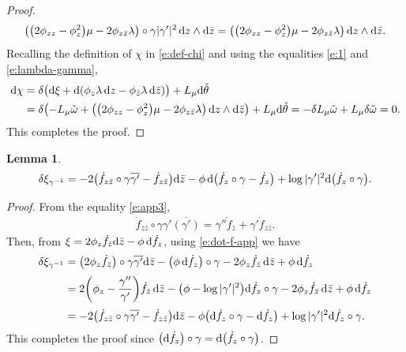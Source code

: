 \documentclass[10pt,a4paper]{amsart}
\numberwithin{equation}{section}
\newtheorem{Lemma}[Theorem]{Lemma}
\begin{document}
\begin{proof}
\begin{gather}\label{e:lambda-gamma}
\big(\big(2\phi_{zz}-\phi^2_z\big)\mu -2\phi_{z\bar{z}} \lambda \big)\circ \gamma |\gamma'|^2\, {\rm d}z\wedge {\rm d}\bar{z} = \big(\big(2\phi_{zz}-\phi^2_z\big)\mu -2\phi_{z\bar{z}} \lambda \big)\, {\rm d}z\wedge {\rm d}\bar{z}.
\end{gather}
Recalling the definition of ${\chi}$ in \eqref{e:def-chi} and using the equalities \eqref{e:1} and \eqref{e:lambda-gamma},
\begin{align*}
{\rm d}\chi &= \delta\big({\rm d}\xi+ {\rm d} (\phi_z \lambda \,{\rm d}z- \phi_{\bar{z}} \lambda\, {\rm d}\bar{z})\big) + L_{\mu}{\rm d}\check{\theta}
\\
&= \delta\big({-}L_\mu \check{\omega}+ \big(\big(2\phi_{zz}-\phi^2_z\big)\mu -2\phi_{z\bar{z}} \lambda \big)\, {\rm d}z\wedge {\rm d}\bar{z}\big)+ L_{\mu}{\rm d}\check{\theta}
= - \delta L_\mu \check{\omega} +L_\mu \delta \check{\omega} =0.
\end{align*}
This completes the proof.
\end{proof}

\begin{Lemma}\label{l:l3}
\begin{gather*}
\delta\xi_{\gamma^{-1}}=-2\big(\dot{f}_{z\bar{z}}\circ\gamma\overline{\gamma'}-\dot{f}_{z\bar{z}}\big){\rm d}\bar{z}-\phi\, {\rm d}\big(\dot{f}_z\circ\gamma-\dot{f}_z\big)+\log|\gamma'|^2 {\rm d}\big(\dot{f}_z\circ\gamma\big).
\end{gather*}
\end{Lemma}

\begin{proof}
From the equality \eqref{e:app3},
\begin{gather}\label{e:dot-f-app}
\dot{f}_{z\bar{z}} \circ \gamma \gamma' \overline{(\gamma')} = \gamma''\dot{f}_{\bar{z}} +\gamma' \dot{f}_{z\bar{z}}.
\end{gather}
Then, from $\xi= 2\phi_z \dot{f}_{\bar{z}} {\rm d}\bar{z} -\phi \,{\rm d}\dot{f}_z$, using \eqref{e:dot-f-app} we have
\begin{align*}
\delta\xi_{\gamma^{-1}} &= \big(2\phi_z \dot{f}_{\bar{z}}\big) \circ \gamma \overline{\gamma'} {\rm d}\bar{z} -\big(\phi \,{\rm d}\dot{f}_z\big)\circ\gamma -2\phi_z\dot{f}_{\bar{z}}\, {\rm d}\bar{z} +\phi\, {\rm d}\dot{f}_z
\\[.5ex]
&=2\bigg( \phi_z -\frac{\gamma''}{\gamma'} \bigg)\dot{f}_{\bar{z}}\, {\rm d}\bar{z} -\big(\phi -\log|\gamma'|^2 \big) {\rm d}\dot{f}_z\circ\gamma - 2\phi_z\dot{f}_{\bar{z}}\, {\rm d}\bar{z} +\phi \,{\rm d}\dot{f}_z
\\[.5ex]
&=-2\big(\dot{f}_{z\bar{z}}\circ\gamma\overline{\gamma'}-\dot{f}_{z\bar{z}}\big){\rm d}\bar{z} -\phi \big( {\rm d}\dot{f}_{z}\circ\gamma - {\rm d}\dot{f}_z \big) + \log|\gamma'|^2 {\rm d}\dot{f}_z\circ\gamma.
\end{align*}
This completes the proof since $\big({\rm d}\dot{f}_z\big)\circ\gamma = {\rm d}\big( \dot{f}_z\circ\gamma\big)$.
\end{proof}
\end{document}
